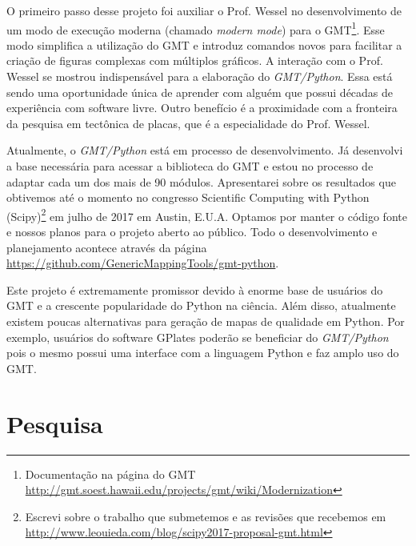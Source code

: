 \documentclass[12pt,a4paper,oneside,titlepage,onecolumn]{article}
\begin{document}
O primeiro passo desse projeto foi auxiliar o Prof. Wessel no desenvolvimento
de um modo de execução moderna (chamado \textit{modern mode}) para o
GMT\footnote{Documentação na página do GMT
\url{http://gmt.soest.hawaii.edu/projects/gmt/wiki/Modernization}}.
Esse modo simplifica a utilização do GMT e introduz comandos novos para
facilitar a criação de figuras complexas com múltiplos gráficos.
A interação com o Prof. Wessel se mostrou indispensável para a elaboração do
\textit{GMT/Python}.
Essa está sendo uma oportunidade única de aprender com alguém que possui
décadas de experiência com software livre.
Outro benefício é a proximidade com a fronteira da pesquisa em tectônica de
placas, que é a especialidade do Prof. Wessel.

Atualmente, o \textit{GMT/Python} está em processo de desenvolvimento.
Já desenvolvi a base necessária para acessar a biblioteca do GMT
e estou no processo de adaptar cada um dos mais de 90 módulos.
Apresentarei sobre os resultados que obtivemos até o momento no congresso
Scientific Computing with Python (Scipy)\footnote{Escrevi sobre o trabalho que
submetemos e as revisões que recebemos em
\url{http://www.leouieda.com/blog/scipy2017-proposal-gmt.html}} em julho de 2017 em Austin, E.U.A.
Optamos por manter o código fonte e nossos planos para o projeto aberto ao
público.
Todo o desenvolvimento e planejamento acontece através da página
\url{https://github.com/GenericMappingTools/gmt-python}.

Este projeto é extremamente promissor devido à enorme base de usuários do GMT
e a crescente popularidade do Python na ciência.
Além disso, atualmente existem poucas alternativas para geração de mapas de
qualidade em Python.
Por exemplo, usuários do software GPlates \citep{gplates} poderão se beneficiar
do \textit{GMT/Python} pois o mesmo possui uma interface com a linguagem Python
e faz amplo uso do GMT.

\section{Pesquisa}
\end{document}
